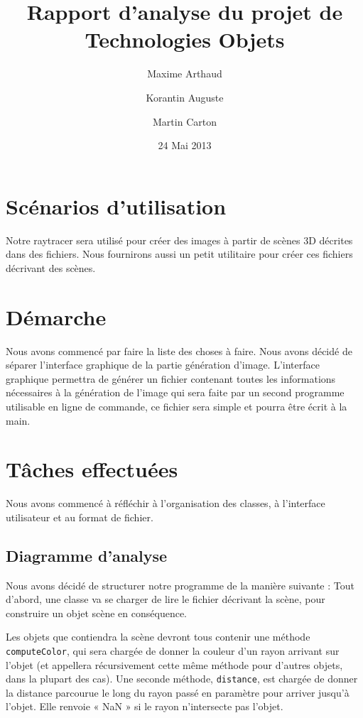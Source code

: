 \documentclass[a4paper]{article}
\title{Rapport d'analyse du projet de Technologies Objets}
\author{Maxime Arthaud \and Korantin Auguste \and Martin Carton}
\date{24 Mai 2013}
\begin{document}
\maketitle

\section{Scénarios d'utilisation}
  Notre raytracer sera utilisé pour créer des images à partir de scènes 3D décrites
  dans des fichiers.
  Nous fournirons aussi un petit utilitaire pour créer ces fichiers décrivant des scènes.

\section{Démarche}
  Nous avons commencé par faire la liste des choses à faire. Nous avons décidé
  de séparer l'interface graphique de la partie génération d'image. L'interface
  graphique permettra de générer un fichier contenant toutes les informations
  nécessaires à la génération de l'image qui sera faite par un second programme
  utilisable en ligne de commande, ce fichier sera simple et pourra être écrit
  à la main.

\section{Tâches effectuées}
  Nous avons commencé à réfléchir à l'organisation des classes, à l'interface
  utilisateur et au format de fichier.

  \subsection{Diagramme d'analyse}

    Nous avons décidé de structurer notre programme de la manière suivante :
    Tout d'abord, une classe va se charger de lire le fichier décrivant la scène,
    pour construire un objet scène en conséquence.

    Les objets que contiendra la scène devront tous contenir une méthode
    \verb+computeColor+, qui sera chargée de donner la couleur d'un rayon
    arrivant sur l'objet (et appellera récursivement cette même méthode pour
    d'autres objets, dans la plupart des cas).
    Une seconde méthode, \verb+distance+, est chargée de donner la distance parcourue
    le long du rayon passé en paramètre pour arriver jusqu'à l'objet. Elle renvoie « NaN »
    si le rayon n'intersecte pas l'objet.
\end{document}

